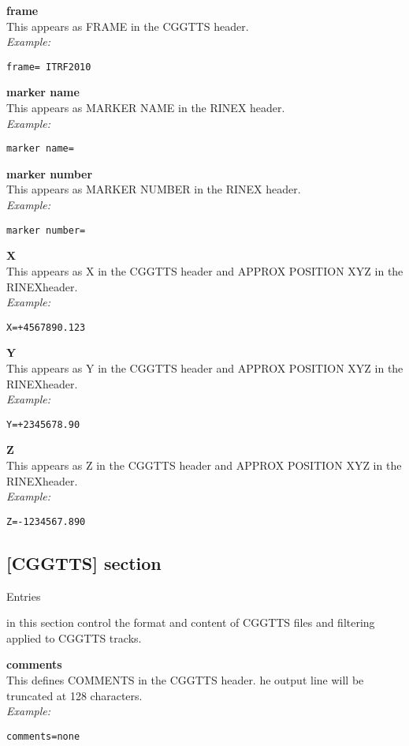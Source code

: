 {\bfseries frame}\\
This appears as FRAME in the CGGTTS header.\\
\textit{Example:}
\begin{lstlisting}
frame= ITRF2010
\end{lstlisting}

{\bfseries marker name}\\
This appears as MARKER NAME in the RINEX header.\\
\textit{Example:}
\begin{lstlisting}
marker name=
\end{lstlisting}

{\bfseries marker number}\\
This appears as MARKER NUMBER in the RINEX header.\\
\textit{Example:}
\begin{lstlisting}
marker number=
\end{lstlisting}

{\bfseries X}\\
This appears as X in the CGGTTS header and APPROX POSITION XYZ in the RINEXheader.\\
\textit{Example:}
\begin{lstlisting}
X=+4567890.123
\end{lstlisting}

{\bfseries Y}\\
This appears as Y in the CGGTTS header and APPROX POSITION XYZ in the RINEXheader.\\
\textit{Example:}
\begin{lstlisting}
Y=+2345678.90
\end{lstlisting}

{\bfseries Z}\\
This appears as Z in the CGGTTS header and APPROX POSITION XYZ in the RINEXheader.\\
\textit{Example:}
\begin{lstlisting}
Z=-1234567.890 
\end{lstlisting}


\subsection{[CGGTTS] section }

\hypertarget{h:cggtts}{Entries} in this section control the format and content of CGGTTS files and filtering applied to CGGTTS tracks.


{\bfseries comments}\\
This defines COMMENTS in the CGGTTS header.
he output line will be truncated at 128 characters.\\
\textit{Example:}
\begin{lstlisting}
comments=none
\end{lstlisting}

